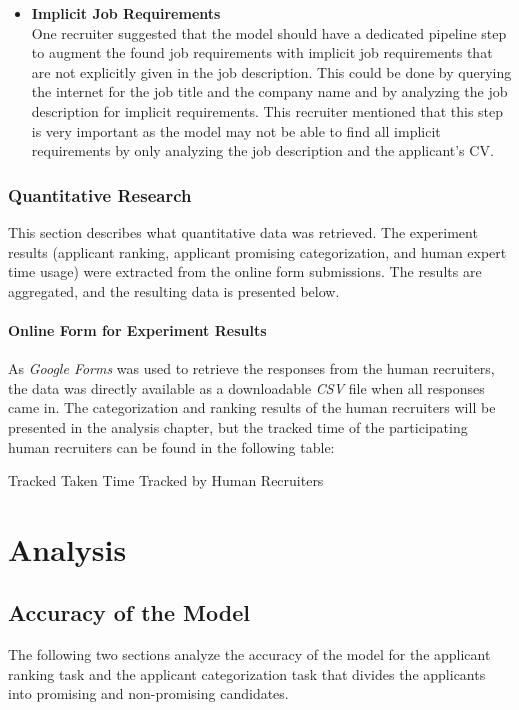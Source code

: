 \documentclass[draft,final]{thesisclass} %
\newcommand{\csv}[2]{
    \begin{table}[h]
        \centering{}
        \resizebox{\linewidth}{!}{\csvautotabular[options]{../generated_tables/#1.csv}}
        \caption{#2}
        \label{tab:#2}
    \end{table}
}
\begin{document}
\begin{enumerate}
\begin{itemize}
        \item \textbf{Implicit Job Requirements}\\
        One recruiter suggested that the model should have a dedicated pipeline step to augment the found job requirements with implicit job requirements that are not explicitly given in the job description. This could be done by querying the internet for the job title and the company name and by analyzing the job description for implicit requirements. This recruiter mentioned that this step is very important as the model may not be able to find all implicit requirements by only analyzing the job description and the applicant's \acs{CV}.
    \end{itemize}
\end{enumerate}

\subsection{Quantitative Research}
This section describes what quantitative data was retrieved.
The experiment results (applicant ranking, applicant promising categorization, and human expert time usage) were extracted from the online form submissions.
The results are aggregated, and the resulting data is presented below.

\subsubsection{Online Form for Experiment Results}
As \textit{Google Forms} was used to retrieve the responses from the human recruiters, the data was directly available as a downloadable \textit{CSV} file when all responses came in. The categorization and ranking results of the human recruiters will be presented in the analysis chapter, but the tracked time of the participating human recruiters can be found in the following table:
\csv{taken_time}{Tracked Taken Time Tracked by Human Recruiters}

\chapter{Analysis} \label{analysis}

\section{Accuracy of the Model}
The following two sections analyze the accuracy of the model for the applicant ranking task and the applicant categorization task that divides the applicants into promising and non-promising candidates.
\end{document}
